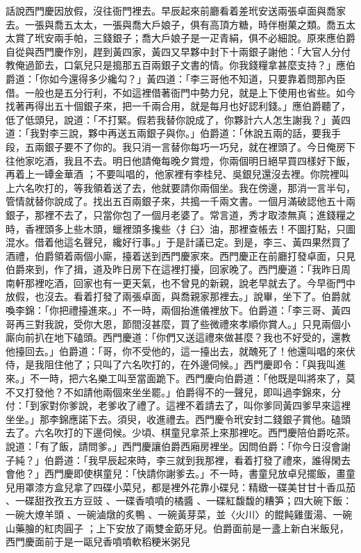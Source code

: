 \begin{showcontents}{}
話說西門慶因放假，沒往衙門裡去。早辰起來前廳看着差玳安送兩張卓面與喬家去。一張與喬五太太，一張與喬大戶娘子，俱有高頂方糖，時伴樹菓之類。喬五太太賞了玳安兩手帕，三錢銀子；喬大戶娘子是一疋青絹，俱不必細說。原來應伯爵自從與西門慶作別，趕到黃四家，黃四又早夥中封下十兩銀子謝他：「大官人分付教俺過節去，口氣兒只是搗那五百兩銀子文書的情。你我錢糧拿甚麼支持？」應伯爵道：「你如今還得多少纔勾？」黃四道：「李三哥他不知道，只要靠着問那內臣借。一般也是五分行利，不如這裡借著衙門中勢力兒，就是上下使用也省些。如今找著再得出五十個銀子來，把一千兩合用，就是每月也好認利錢。」應伯爵聽了，低了低頭兒，說道：「不打緊。假若我替你說成了，你夥計六人怎生謝我？」黃四道：「我對李三說，夥中再送五兩銀子與你。」伯爵道：「休說五兩的話，要我手段，五兩銀子要不了你的。我只消一言替你每巧一巧兒，就在裡頭了。今日俺房下往他家吃酒，我且不去。明日他請俺每晚夕賞燈，你兩個明日絕早買四樣好下飯，再着上一罈金華酒 ；不要叫唱的，他家裡有李桂兒、吳銀兒還沒去裡。你院裡叫上六名吹打的，等我領着送了去，他就要請你兩個坐。我在傍邊，那消一言半句，管情就替你說成了。找出五百兩銀子來，共搗一千兩文書。一個月滿破認他五十兩銀子，那裡不去了，只當你包了一個月老婆了。常言道，秀才取漆無真；進錢糧之時，香裡頭多上些木頭，蠟裡頭多攙些〈扌臼〉油，那裡查帳去！不圖打點，只圖混水。借着他這名聲兒，纔好行事。」于是計議已定。到是，李三、黃四果然買了酒禮，伯爵領着兩個小廝，擡着送到西門慶家來。西門慶正在前廳打發卓面，只見伯爵來到，作了揖，道及昨日房下在這裡打擾，回家晚了。西門慶道：「我昨日周南軒那裡吃酒，回家也有一更天氣，也不曾見的新親，說老早就去了。今早衙門中放假，也沒去。看着打發了兩張卓面，與喬親家那裡去。」說畢，坐下了。伯爵就喚李錦：「你把禮擡進來。」不一時，兩個抬進儀裡放下。伯爵道：「李三哥、黃四哥再三對我說，受你大恩，節間沒甚麼，買了些微禮來孝順你賞人。」只見兩個小廝向前扒在地下磕頭。西門慶道：「你們又送這禮來做甚麼？我也不好受的，還教他擡回去。」伯爵道：「哥，你不受他的，這一擡出去，就醜死了！他還叫唱的來伏侍，是我阻住他了；只叫了六名吹打的，在外邊伺候。」西門慶即令：「與我叫進來。」不一時，把六名樂工叫至當面跪下。西門慶向伯爵道：「他既是叫將來了，莫不又打發他？不如請他兩個來坐坐罷。」伯爵得不的一聲兒，即叫過李錦來，分付：「到家對你爹說，老爹收了禮了。這裡不着請去了，叫你爹同黃四爹早來這裡坐坐。」那李錦應諾下去。須臾，收進禮去。西門慶令玳安封二錢銀子賞他。磕頭去了。六名吹打的下邊伺候。少頃、棋童兒拿茶上來那裡吃。西門慶陪伯爵吃茶。說道：「有了飯，請問爹。」西門慶讓伯爵西廂房裡坐。因問伯爵：「你今日沒會謝子純？」伯爵道：「我早辰起來時，李三就到我那裡，看着打發了禮來，誰得閑去會他？」西門慶即使棋童兒：「快請你謝爹去。」不一時，書童兒放卓兒擺飯，畫童兒用罩漆方盒兒拿了四碟小菜兒，都是裡外花靠小碟兒：精緻一碟美甘甘十香瓜茄 、一碟甜孜孜五方豆豉 、一碟香噴噴的橘醬 、一碟紅馥馥的糟笋；四大碗下飯：一碗大燎羊頭 、一碗滷燉的炙鴨 、一碗黃芽菜，並〈火川〉的餛飩雞蛋湯、一碗山藥膾的紅肉圓子 ；上下安放了兩雙金筯牙兒。伯爵面前是一盞上新白米飯兒，西門慶面前于是一甌兒香噴噴軟稻粳米粥兒 
\end{showcontents}
